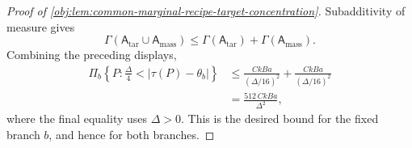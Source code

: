 \begin{proof}[Proof of \cref{obj:lem:common-marginal-recipe-target-concentration}]
Subadditivity of measure gives
\[
\Gamma(\mathsf A_{\mathrm{tar}}\cup\mathsf A_{\mathrm{mass}})
\le
\Gamma(\mathsf A_{\mathrm{tar}})+\Gamma(\mathsf A_{\mathrm{mass}}).
\]
Combining the preceding displays,
\[
\begin{aligned}
\Pi_b\!\left\{P:\frac{\Delta}{4}<|\tau(P)-\theta_b|\right\}
&\le
\frac{CkBa}{(\Delta/16)^2}
+
\frac{CkBa}{(\Delta/16)^2}  \\
&=
\frac{512\,CkBa}{\Delta^2},
\end{aligned}
\]
where the final equality uses \(\Delta>0\).  This is the desired bound for the fixed branch \(b\), and hence for both branches.
\end{proof}
